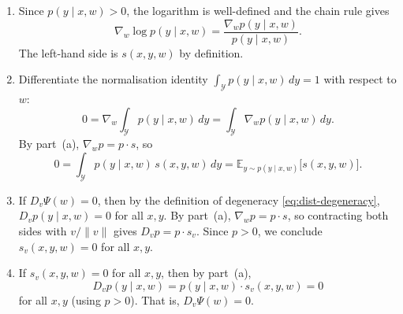 \documentclass[11pt]{article}
\newcommand{\E}{\mathbb{E}}
\newcommand{\Y}{\mathcal{Y}}
\begin{document}
\begin{solution}
\begin{enumerate}
    \item
        Since $p(y \mid x, w) > 0$, the logarithm is well-defined and
        the chain rule gives
        \begin{equation*}
            \nabla_w \log p(y \mid x, w)
            = \frac{\nabla_w p(y \mid x, w)}{p(y \mid x, w)}.
        \end{equation*}
        The left-hand side is $s(x,y,w)$ by definition.

    \item
        Differentiate the normalisation identity
        $\int_\Y p(y \mid x, w) \, dy = 1$
        with respect to $w$:
        \begin{equation*}
            0
            = \nabla_w \int_\Y p(y \mid x, w) \, dy
            = \int_\Y \nabla_w p(y \mid x, w) \, dy.
        \end{equation*}
        By part~(a), $\nabla_w p = p \cdot s$, so
        \begin{equation*}
            0
            = \int_\Y p(y \mid x, w)\, s(x, y, w) \, dy
            = \E_{y \sim p(y \mid x, w)}\bigl[s(x, y, w)\bigr].
        \end{equation*}

    \item
        If $D_v \Psi(w) = 0$, then by the definition of
        degeneracy \eqref{eq:dist-degeneracy},
        $D_v p(y \mid x, w) = 0$ for all $x, y$.
        By part~(a), $\nabla_w p = p \cdot s$, so contracting both sides
        with $v / \|v\|$ gives $D_v p = p \cdot s_v$.
        Since $p > 0$, we conclude $s_v(x, y, w) = 0$ for all $x, y$.

    \item
        If $s_v(x, y, w) = 0$ for all $x, y$, then by part~(a),
        \begin{equation*}
            D_v p(y \mid x, w)
            = p(y \mid x, w) \cdot s_v(x, y, w)
            = 0
        \end{equation*}
        for all $x, y$ (using $p > 0$). That is,
        $D_v \Psi(w) = 0$. \qedhere
\end{enumerate}
\end{solution}
\end{document}
